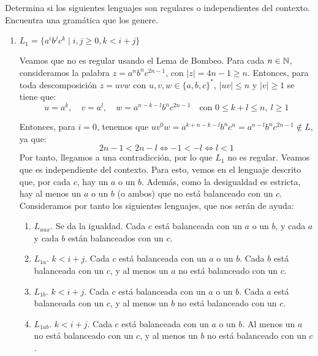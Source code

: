 \begin{ejercicio}\label{ej:1.4.13}
    Determina si los siguientes lenguajes son regulares o independientes del contexto. Encuentra una gramática que los genere.
    \begin{enumerate}
        \item $L_1 = \{ a^i b^j c^k \mid i, j \geq 0, k < i + j \}$
        
        Veamos que no es regular usando el Lema de Bombeo.
        Para cada $n\in \mathbb{N}$, consideramos la palabra $z=a^nb^{n}c^{2n-1}$, con $|z|=4n-1\geq n$. Entonces, para toda descomposición $z=uvw$ con $u,v,w\in \{a,b,c\}^*$, $|uv|\leq n$ y $|v|\geq 1$ se tiene que:
        \begin{equation*}
            u=a^k,\quad v=a^l,\quad w=a^{n-k-l}b^{n}c^{2n-1} \quad \text{con } 0\leq k+l\leq n,~l\geq 1
        \end{equation*}

        Entonces, para $i=0$, tenemos que $uv^0w=a^{k+n-k-l}b^{n}c^{n}=a^{n-l}b^{n}c^{2n-1}\notin L$, ya que:
        \begin{equation*}
            2n-1<2n-l \Longleftrightarrow -1<-l \Longleftrightarrow l<1
        \end{equation*}
        Por tanto, llegamos a una contradicción, por lo que $L_1$ no es regular. Veamos que es independiente del contexto. Para esto, vemos en el lenguaje descrito que, por cada $c$, hay un $a$ o un $b$. Además, como la desigualdad es estricta, hay al menos un $a$ o un $b$ (o ambos) que no está balanceado con un $c$. Consideramos por tanto los siguientes lenguajes, que nos serán de ayuda:
        \begin{enumerate}
            \item $L_{aux}$. Se da la igualdad. Cada $c$ está balanceada con un $a$ o un $b$, y cada $a$ y cada $b$ están balanceados con un $c$.
            \item $L_{1a}$. $k<i+j$. Cada $c$ está balanceada con un $a$ o un $b$.
            Cada $b$ está balanceada con un $c$, y al menos un $a$ no está balanceado con un $c$.
            \item $L_{1b}$. $k<i+j$. Cada $c$ está balanceada con un $a$ o un $b$.
            Cada $a$ está balanceada con un $c$, y al menos un $b$ no está balanceado con un $c$.
            \item $L_{1ab}$. $k<i+j$. Cada $c$ está balanceada con un $a$ o un $b$.
            Al menos un $a$ no está balanceado con un $c$, y al menos un $b$ no está balanceado con un $c$.
        \end{enumerate}


\end{enumerate}
\end{ejercicio}

